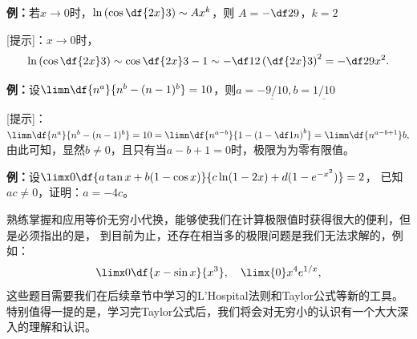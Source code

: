 {\bf 例：}若$x\to 0$时，$\ln\left(\cos\df{2x}3\right)\sim Ax^k$，则
$A=$\underline{$-\df29$}，$k=$\underline{$2$}

[提示]：$x\to 0$时，
$$\ln\left(\cos\df{2x}3\right)\sim \cos\df{2x}3-1
\sim-\df12\left(\df{2x}3\right)^2=-\df29x^2.$$

{\bf 例：}设$\limn\df{n^a}{n^b-(n-1)^b}=10$，则$a=\underline{-9/10},
b=\underline{1/10}$

[提示]：
$\limn\df{n^a}{n^b-(n-1)^b}=10=\limn\df{n^{a-b}}{1-\left(1-\df1n\right)^b}
=\limn\df{n^{a-b+1}}b,$
由此可知，显然$b\ne 0$，且只有当$a-b+1=0$时，极限为为零有限值。

{\bf 例：}设$\limx0\df{a\tan x+b(1-\cos x)}{c\ln(1-2x)+d(1-e^{-x^2})}=2$，
已知$ac\ne 0$，证明：$a=-4c$。

熟练掌握和应用等价无穷小代换，能够使我们在计算极限值时获得很大的便利，但是必须指出的是，
到目前为止，还存在相当多的极限问题是我们无法求解的，例如：
$$\limx0\df{x-\sin x}{x^3},
\quad\limx{0}x^4{e^{1/x}},$$
这些题目需要我们在后续章节中学习的L'Hospital法则和Taylor公式等新的工具。
特别值得一提的是，学习完Taylor公式后，我们将会对无穷小的认识有一个大大深入的理解和认识。

